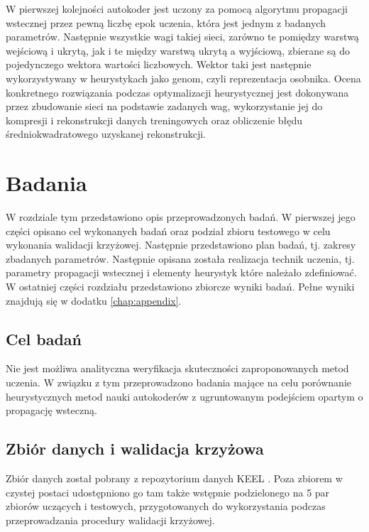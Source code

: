 \documentclass[11pt,a4paper,oneside]{report}
\begin{document}
W pierwszej kolejności autokoder jest uczony za pomocą algorytmu propagacji wstecznej przez pewną liczbę epok uczenia, która jest jednym z badanych parametrów. Następnie wszystkie wagi takiej sieci, zarówno te pomiędzy warstwą wejściową i ukrytą, jak i te między warstwą ukrytą a wyjściową, zbierane są do pojedynczego wektora wartości liczbowych. Wektor taki jest następnie wykorzystywany w heurystykach jako genom, czyli reprezentacja osobnika. Ocena konkretnego rozwiązania podczas optymalizacji heurystycznej jest dokonywana przez zbudowanie sieci na podstawie zadanych wag, wykorzystanie jej do kompresji i rekonstrukcji danych treningowych oraz obliczenie błędu średniokwadratowego uzyskanej rekonstrukcji. 

\chapter{Badania}

W rozdziale tym przedstawiono opis przeprowadzonych badań. W pierwszej jego części opisano cel wykonanych badań oraz podział zbioru testowego w celu wykonania walidacji krzyżowej. Następnie przedstawiono plan badań, tj. zakresy zbadanych parametrów. Następnie opisana została realizacja technik uczenia, tj. parametry propagacji wstecznej i elementy heurystyk które należało zdefiniować. W ostatniej części rozdziału przedstawiono zbiorcze wyniki badań. Pełne wyniki znajdują się w dodatku \ref{chap:appendix}.

\section{Cel badań}

Nie jest możliwa analityczna weryfikacja skuteczności zaproponowanych metod uczenia. W związku z tym przeprowadzono badania mające na celu porównanie heurystycznych metod nauki autokoderów z ugruntowanym podejściem opartym o propagację wsteczną.

\section{Zbiór danych i walidacja krzyżowa}

Zbiór danych został pobrany z repozytorium danych KEEL \cite{alcala2010keel}. Poza zbiorem w czystej postaci udostępniono go tam także wstępnie podzielonego na 5 par zbiorów uczących i testowych, przygotowanych do wykorzystania podczas przeprowadzania procedury walidacji krzyżowej.
\end{document}
